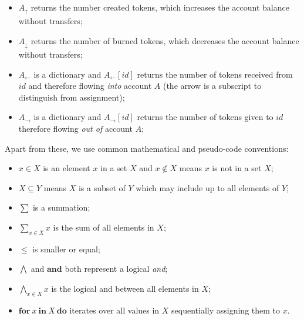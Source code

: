 \documentclass[9pt, oneside]{article}   	%
\begin{document}
\begin{itemize}
		\begin{itemize}
			\item $A_\uparrow$ returns the number created tokens, which increases the account balance without transfers;
			\item $A_\downarrow$ returns the number of burned tokens, which decreases the account balance without transfers;
			\item $A_{\leftarrow}$ is a dictionary and $A_{\leftarrow}[id]$ returns the number of tokens received from $id$ and therefore flowing \textit{into} account $A$ (the arrow is a subscript to distinguish from assignment);
			\item $A_{\rightarrow}$ is a dictionary and $A_{\rightarrow}[id]$ returns the number of tokens given to $id$ therefore flowing \textit{out of} account $A$;
		\end{itemize}
\end{itemize}

Apart from these, we use common mathematical and pseudo-code conventions: 
\begin{itemize}
	\item $x \in X$ is an element $x$ in a set $X$ and $x \notin X$ means $x$ is not in a set $X$;
	\item $X \subseteq Y$ means $X$ is a subset of $Y$ which may include up to all elements of $Y$;
	 \item $\sum$ is a summation;
	 \item $\sum\limits_{x \in X} x$ is the sum of all elements in $X$;
	 \item $\leq$ is smaller or equal;
	 \item $\bigwedge$ and $\textbf{and}$ both represent a logical \textit{and};
	 \item $\bigwedge\limits_{x \in X} x$ is the logical and between all elements in $X$;
	 \item $\textbf{for}~x ~\textbf{in}~ X~\textbf{do}$ iterates over all values in $X$ sequentially assigning them to $x$.
\end{itemize}
\end{document}
